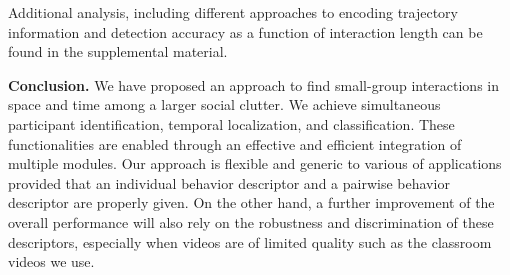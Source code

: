 Additional analysis, including different approaches to encoding trajectory information and detection accuracy as a function of interaction length can be found in the supplemental material.

\vspace{0.05in}

\noindent\textbf{Conclusion.} We have proposed an approach to find small-group interactions in space and time among a larger social clutter. We achieve simultaneous participant identification, temporal localization, and classification. These functionalities are enabled through an effective and efficient integration of multiple modules. Our approach is flexible and generic to various of applications provided that an individual behavior descriptor and a pairwise behavior descriptor are properly given. On the other hand, a further improvement of the overall performance will also rely on the robustness and discrimination of these descriptors, especially when videos are of limited quality such as the classroom videos we use. 




